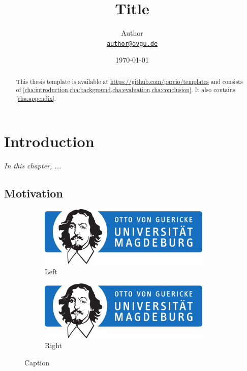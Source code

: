 \documentclass[
	12pt,
	a4paper,
	abstract,
	bibliography=totoc,
	chapterprefix,
	numbers=endperiod,
	parskip=half,
]{scrreprt}
\title{Title}
\author{
Author\\
{\large\href{mailto:author@ovgu.de}{\nolinkurl{author@ovgu.de}}}
}
\date{\today}
\begin{document}
\maketitle

\begin{abstract}
\lipsum[1]

This thesis template is available at \url{https://github.com/parcio/templates} and consists of \cref{cha:introduction,cha:background,cha:evaluation,cha:conclusion}.
It also contains \cref{cha:appendix}.
\end{abstract}

\tableofcontents

\chapter{Introduction}
\label{cha:introduction}

\textit{In this chapter, ...}

\section{Motivation}

\begin{figure}[ht]
	\centering
	\begin{subfigure}{0.45\textwidth}
		\centering
		\includegraphics[width=0.9\textwidth]{OVGU-INF}
		\caption{Left}
		\label{fig:left}
	\end{subfigure}
	\begin{subfigure}{0.45\textwidth}
		\centering
		\includegraphics[width=0.9\textwidth]{OVGU-INF}
		\caption{Right}
		\label{fig:right}
	\end{subfigure}
	\caption{Caption}
	\label{fig:both}
\end{figure}
\end{document}
